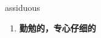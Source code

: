 
\begin{frame}
{\huge assiduous}
\begin{center}
\begin{enumerate}\Large
  \item \textbf{勤勉的，专心仔细的}
\end{enumerate}
\end{center}
\end{frame}

